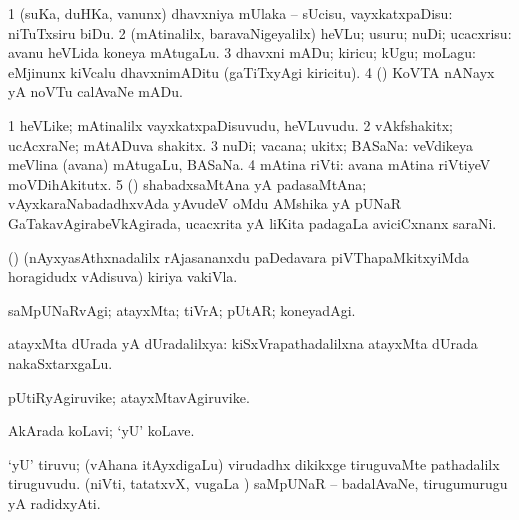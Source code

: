 \bentry
{} 
\gl{\sakirx}
\expl{}
\bmng
\bnum
\num{1} (suKa, duHKa, \mo vanunx) dhavxniya mUlaka -- sUcisu, vayxkatxpaDisu:  niTuTxsiru biDu. 
\num{2} (mAtinalilx, baravaNigeyalilx) heVLu; usuru; nuDi; ucacxrisu:  avanu heVLida koneya mAtugaLu. 
\num{3} dhavxni mADu; kiricu; kUgu; moLagu:  eMjinunx kiVcalu dhavxnimADitu (gaTiTxyAgi kiricitu). 
\num{4} (\nAyxshA) KoVTA nANayx yA noVTu calAvaNe mADu. 
\enum
\emng
\eentry

\bentry
{} 
\gl{\nA}
\bmng
\bnum
\num{1} heVLike; mAtinalilx vayxkatxpaDisuvudu, heVLuvudu. 
\num{2} vAkfshakitx; ucAcxraNe; mAtADuva shakitx. 
\num{3} nuDi; vacana; ukitx; BASaNa:  veVdikeya meVlina (avana) mAtugaLu, BASaNa. 
\num{4} mAtina riVti:  avana mAtina riVtiyeV moVDihAkitutx. 
\num{5} (\BAshA) shabadxsaMtAna yA padasaMtAna; vAyxkaraNabadadhxvAda yAvudeV oMdu AMshika yA pUNaR GaTakavAgirabeVkAgirada, ucacxrita yA liKita padagaLa aviciCxnanx saraNi. 
\enum
\emng
\eentry

\bentry
{}
\gl{\nA}
\expl{}
\bmng
(\birx) (nAyxyasAthxnadalilx rAjasananxdu paDedavara piVThapaMkitxyiMda horagidudx vAdisuva) kiriya vakiVla. 
\emng
\eentry

\bentry
{} 
\gl{\kirxvi}
\expl{}
\bmng
saMpUNaRvAgi; atayxMta; tiVrA; pUtAR; koneyadAgi. 
\emng
\eentry

\bentry
{} 
\gl{\gu}
\expl{}
\bmng
atayxMta dUrada yA dUradalilxya:  kiSxVrapathadalilxna atayxMta dUrada nakaSxtarxgaLu. 
\emng
\eentry

\bentry
{} 
\gl{\nA}
\expl{}
\bmng
pUtiRyAgiruvike; atayxMtavAgiruvike. 
\emng
\eentry

\bentry
{} 
\gl{\nA}
\expl{}
\bmng
{} AkArada koLavi; `yU' koLave. 
\emng
\eentry

\bentry
{} 
\gl{\nA}
\expl{}
\bmng
\banum
{} `yU' tiruvu; (vAhana itAyxdigaLu) virudadhx dikikxge tiruguvaMte  pathadalilx tiruguvudu. 
 (niVti, tatatxvX, \mo vugaLa \vi) saMpUNaR -- badalAvaNe, tirugumurugu yA radidxyAti. 
\eanum
\emng
\eentry

\bentry 
{}
\gl{\saMkiSx}
\expl{}
\bmng
{} 
\emng
\eentry

